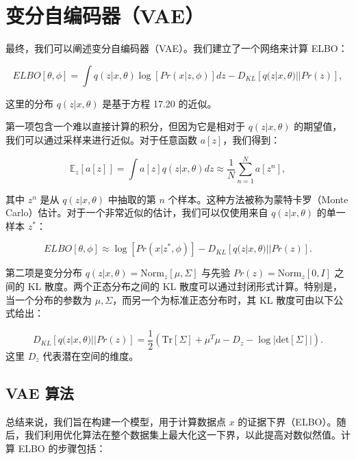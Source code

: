 \documentclass[lang=cn,newtx,10pt,scheme=chinese]{elegantbook}
\begin{document}
\section{变分自编码器（VAE）}
最终，我们可以阐述变分自编码器（VAE）。我们建立了一个网络来计算 ELBO：

\begin{equation}
ELBO[\theta, \phi] = \int q(z|x, \theta) \log \left[ Pr(x|z, \phi) \right] dz - D_{KL} \left[ q(z|x, \theta) || Pr(z) \right], 
\end{equation}

这里的分布 \(q(z|x, \theta)\) 是基于方程 17.20 的近似。

第一项包含一个难以直接计算的积分，但因为它是相对于 \(q(z|x, \theta)\) 的期望值，我们可以通过采样来进行近似。对于任意函数 \(a[z]\)，我们得到：

\begin{equation}
\mathbb{E}_z [a[z]] = \int a[z] q(z|x, \theta) dz \approx \frac{1}{N} \sum_{n=1}^N a[z^n], 
\end{equation}

其中 \(z^n\) 是从 \(q(z|x, \theta)\) 中抽取的第 \(n\) 个样本。这种方法被称为蒙特卡罗（Monte Carlo）估计。对于一个非常近似的估计，我们可以仅使用来自 \(q(z|x, \theta)\) 的单一样本 \(z^*\)：

\begin{equation}
ELBO[\theta, \phi] \approx \log \left[ Pr(x|z^*, \phi) \right] - D_{KL} \left[ q(z|x, \theta) || Pr(z) \right]. 
\end{equation}

第二项是变分分布 \(q(z|x, \theta) = \text{Norm}_z[\mu, \Sigma]\) 与先验 \(Pr(z) = \text{Norm}_z[0, I]\) 之间的 KL 散度。两个正态分布之间的 KL 散度可以通过封闭形式计算。特别是，当一个分布的参数为 \(\mu, \Sigma\)，而另一个为标准正态分布时，其 KL 散度可由以下公式给出：

\begin{equation}
D_{KL} \left[ q(z|x, \theta) || Pr(z) \right] = \frac{1}{2} \left( \text{Tr}[\Sigma] + \mu^T \mu - D_z - \log \left| \text{det}[\Sigma] \right| \right). 
\end{equation}
这里 \(D_z\) 代表潜在空间的维度。


\subsection{VAE 算法}
总结来说，我们旨在构建一个模型，用于计算数据点 \(x\) 的证据下界（ELBO）。随后，我们利用优化算法在整个数据集上最大化这一下界，以此提高对数似然值。计算 ELBO 的步骤包括：
\end{document}
